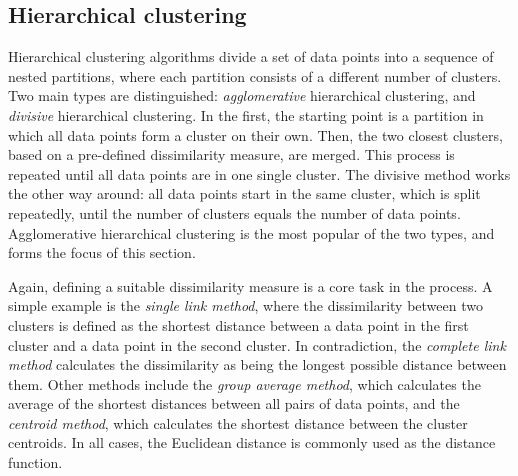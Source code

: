 \documentclass[12pt,oneside]{reedthesis}
\begin{document}
\subsection{Hierarchical clustering}\label{hierarchical-clustering}

Hierarchical clustering algorithms divide a set of data points into a
sequence of nested partitions, where each partition consists of a
different number of clusters. Two main types are distinguished:
\emph{agglomerative} hierarchical clustering, and \emph{divisive}
hierarchical clustering. In the first, the starting point is a partition
in which all data points form a cluster on their own. Then, the two
closest clusters, based on a pre-defined dissimilarity measure, are
merged. This process is repeated until all data points are in one single
cluster. The divisive method works the other way around: all data points
start in the same cluster, which is split repeatedly, until the number
of clusters equals the number of data points. Agglomerative hierarchical
clustering is the most popular of the two types, and forms the focus of
this section.

Again, defining a suitable dissimilarity measure is a core task in the
process. A simple example is the \emph{single link method}, where the
dissimilarity between two clusters is defined as the shortest distance
between a data point in the first cluster and a data point in the second
cluster. In contradiction, the \emph{complete link method} calculates
the dissimilarity as being the longest possible distance between them.
Other methods include the \emph{group average method}, which calculates
the average of the shortest distances between all pairs of data points,
and the \emph{centroid method}, which calculates the shortest distance
between the cluster centroids. In all cases, the Euclidean distance is
commonly used as the distance function.
\end{document}
